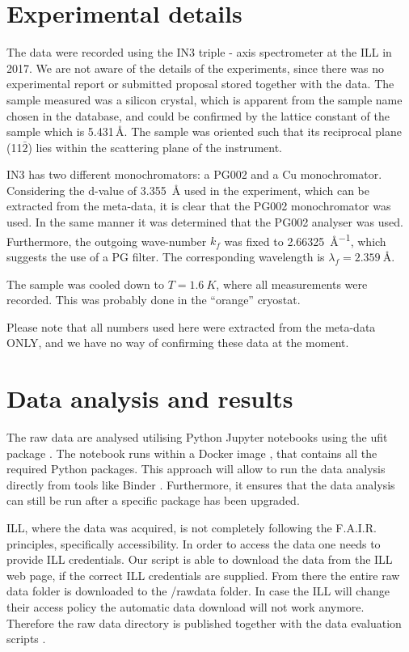 \documentclass[aps,pra,reprint,amsmath,amssymb,superscriptaddress,showkeys]{revtex4-1}
\begin{document}
\section{Experimental details}

The data were recorded using the IN3 triple - axis spectrometer \cite{IN3} at the ILL in 2017.
We are not aware of the details of the experiments, since there was no experimental report or submitted proposal stored together with the data.
The sample measured was a silicon crystal, which is apparent from the sample name chosen in the database, and could be confirmed by the lattice constant of the sample which is 5.431\,\AA \cite{Hom1975}. The sample was oriented such that its reciprocal plane (11$\bar{2}$) lies within the scattering plane of the instrument.

IN3 has two different monochromators: a PG002 and a Cu monochromator.
Considering the d-value of \SI{3.355}{\mbox{\AA}} used in the experiment, which can be extracted from the meta-data, it is clear that the PG002 monochromator was used.
In the same manner it was determined that the PG002 analyser was used. 
Furthermore, the outgoing wave-number $k_f$ was fixed to \SI{2.66325}{\mbox{\AA}^{-1}}, which suggests the use of a PG filter. 
The corresponding wavelength is $\lambda_f=\SI{2.359}{\mbox{\AA}}$.

The sample was cooled down to $T = \SI{1.6}{K}$, where all measurements were recorded. 
This was probably done in the ``orange'' cryostat.

Please note that all numbers used here were extracted from the meta-data ONLY, and we have no way of confirming these data at the moment. 


\section{Data analysis and results}

The raw data are analysed utilising Python Jupyter notebooks \cite{jupyter} using the ufit package \cite{ufit}.
The notebook \cite{data-evaluation} runs within a Docker image \cite{Docker}, that contains all the required Python packages.
This approach will allow to run the data analysis \cite{data-docker} directly from tools like Binder \cite{binder}.
Furthermore, it ensures that the data analysis can still be run after a specific package has been upgraded.

ILL, where the data was acquired, is not completely following the F.A.I.R. principles, specifically accessibility. 
In order to access the data one needs to provide ILL credentials. 
Our script is able to download the data from the ILL web page, if the correct ILL credentials are supplied. 
From there the entire raw data folder is downloaded to the /rawdata folder. 
In case the ILL will change their access policy the automatic data download will not work anymore. 
Therefore the raw data directory is published together with the data evaluation scripts \cite{data-evaluation}.
\end{document}
